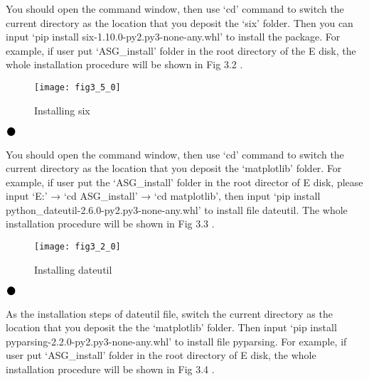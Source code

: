 \hspace{-0.2cm}You should open the command window, then use `cd' command to switch the current directory as the location that you deposit the `six' folder. Then you can input `pip install six-1.10.0-py2.py3-none-any.whl' to install the package. For example, if user put `ASG\_install' folder in the root directory of  the E disk, the whole installation procedure will be shown in Fig 3.2 .
\begin{figure}[H]
\centering
\texttt{[image: fig3\_5\_0]}
\caption{\hspace{0.2cm}Installing six}
\end{figure}

\noindent$\vcenter{\hbox{\huge$\bullet$}}$\quad\fontsize{12pt}{\baselineskip}\textbf{ }

\hspace{-0.2cm}You should open the command window, then use `cd' command to switch the current directory as the location that you deposit the `matplotlib' folder. For example, if user put the `ASG\_install' folder in the root director of E disk, please input `E:' → `cd ASG\_install' → `cd matplotlib', then input `pip install python\_dateutil-2.6.0-py2.py3-none-any.whl' to install file dateutil. The whole installation procedure will be shown in Fig 3.3 .
\begin{figure}[ht]
\centering
\texttt{[image: fig3\_2\_0]}
\caption{\hspace{0.2cm}Installing dateutil}
\end{figure}

\noindent$\vcenter{\hbox{\huge$\bullet$}}$\quad\fontsize{12pt}{\baselineskip}\textbf{}

\hspace{-0.2cm}As the installation steps of dateutil file, switch the current directory as the location that you deposit the the `matplotlib' folder. Then input `pip install pyparsing-2.2.0-py2.py3-none-any.whl' to install file pyparsing. For example, if user put `ASG\_install' folder in the root directory of E disk, the whole installation procedure will be shown in Fig 3.4 .

